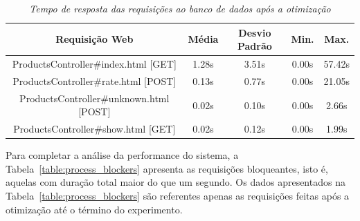 \begin{table}\centering
\begin{tabular}{c c c c c}
\hline \hline
\textbf{Requisição Web}
& \textbf{Média}
& \textbf{Desvio Padrão}
& \textbf{Min.} 
& \textbf{Max.} \\ \hline
ProductsController\#index.html [GET]    & 1.28s &  3.51s &  0.00s & 57.42s \\
\hline
ProductsController\#rate.html [POST]    & 0.13s &  0.77s &  0.00s & 21.05s \\
\hline
ProductsController\#unknown.html [POST] & 0.02s &  0.10s &  0.00s &  2.66s \\
\hline
ProductsController\#show.html [GET]     & 0.02s &  0.12s &  0.00s &  1.99s \\
\hline
\end{tabular}
\caption{\it Tempo de resposta das requisições ao banco de dados após a otimização \label{table:after_stats}}
\end{table}

Para completar a análise da performance do sistema, a Tabela~\ref{table:process_blockers} apresenta as requisições bloqueantes, isto é, aquelas com duração total maior do que um segundo. Os dados apresentados na Tabela~\ref{table:process_blockers} são referentes apenas as requisições feitas após a otimização até o término do experimento.

